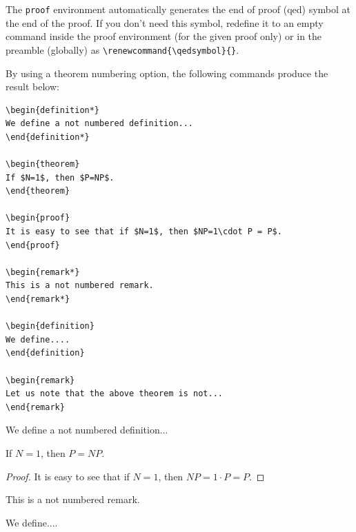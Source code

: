 \documentclass[withtitlethanks]{actacyb}
\begin{document}
The \verb|proof| environment automatically generates the end of proof (qed) symbol
at the end of the proof. If you don't need this symbol, redefine it to an empty command
inside the proof environment (for the given proof only) or in the preamble (globally) as \verb|\renewcommand{\qedsymbol}{}|.

By using a theorem numbering option, the following commands produce the result below:

\begin{verbatim}
\begin{definition*}
We define a not numbered definition...
\end{definition*}

\begin{theorem}
If $N=1$, then $P=NP$.
\end{theorem}

\begin{proof}
It is easy to see that if $N=1$, then $NP=1\cdot P = P$.
\end{proof}

\begin{remark*}
This is a not numbered remark.
\end{remark*}

\begin{definition}
We define....
\end{definition}

\begin{remark}
Let us note that the above theorem is not...
\end{remark}
\end{verbatim}


\begin{definition*}
We define a not numbered definition...
\end{definition*}

\begin{theorem}
If $N=1$, then $P=NP$.
\end{theorem}

\begin{proof}
It is easy to see that if $N=1$, then $NP=1\cdot P = P$.
\end{proof}

\begin{remark*}
This is a not numbered remark.
\end{remark*}

\begin{definition}
We define....
\end{definition}
\end{document}
